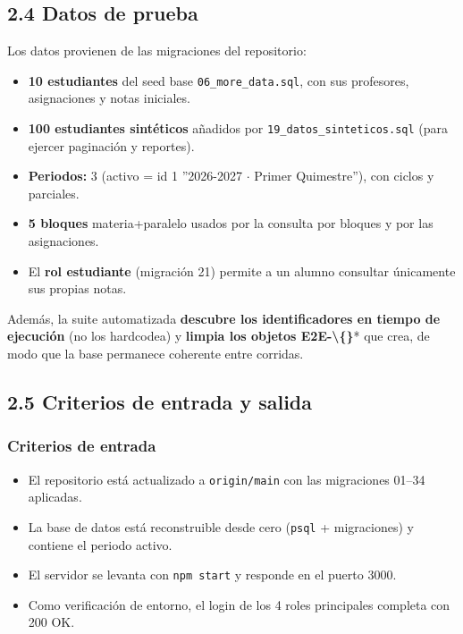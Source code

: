 \documentclass[11pt,a4paper]{article}
\begin{document}
\subsection*{2.4 Datos de prueba}


Los datos provienen de las migraciones del repositorio:


\begin{itemize}[leftmargin=*]
\item \textbf{10 estudiantes} del seed base \texttt{06\_more\_data.sql}, con sus profesores, asignaciones y notas iniciales.
\item \textbf{100 estudiantes sintéticos} añadidos por \texttt{19\_datos\_sinteticos.sql} (para ejercer paginación y reportes).
\item \textbf{Periodos:} 3 (activo = id 1 ''2026-2027 {$\cdot$} Primer Quimestre''), con ciclos y parciales.
\item \textbf{5 bloques} materia+paralelo usados por la consulta por bloques y por las asignaciones.
\item El \textbf{rol estudiante} (migración 21) permite a un alumno consultar únicamente sus propias notas.
\end{itemize}


Además, la suite automatizada \textbf{descubre los identificadores en tiempo de ejecución} (no los hardcodea) y \textbf{limpia los objetos E2E-\textbackslash\{\}}* que crea, de modo que la base permanece coherente entre corridas.


\subsection*{2.5 Criterios de entrada y salida}


\subsubsection*{Criterios de entrada}


\begin{itemize}[leftmargin=*]
\item El repositorio está actualizado a \texttt{origin/main} con las migraciones 01--34 aplicadas.
\item La base de datos está reconstruible desde cero (\texttt{psql} + migraciones) y contiene el periodo activo.
\item El servidor se levanta con \texttt{npm start} y responde en el puerto 3000.
\item Como verificación de entorno, el login de los 4 roles principales completa con 200 OK.
\end{itemize}
\end{document}

